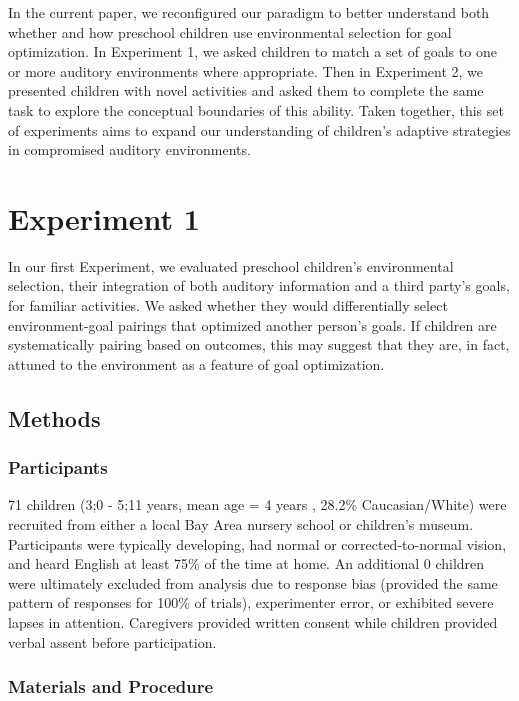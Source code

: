 \documentclass[10pt, letterpaper]{article}
\begin{document}
In the current paper, we reconfigured our paradigm to better understand
both whether and how preschool children use environmental selection for
goal optimization. In Experiment 1, we asked children to match a set of
goals to one or more auditory environments where appropriate. Then in
Experiment 2, we presented children with novel activities and asked them
to complete the same task to explore the conceptual boundaries of this
ability. Taken together, this set of experiments aims to expand our
understanding of children's adaptive strategies in compromised auditory
environments.

\hypertarget{experiment-1}{%
\section{Experiment 1}\label{experiment-1}}

In our first Experiment, we evaluated preschool children's environmental
selection, their integration of both auditory information and a third
party's goals, for familiar activities. We asked whether they would
differentially select environment-goal pairings that optimized another
person's goals. If children are systematically pairing based on
outcomes, this may suggest that they are, in fact, attuned to the
environment as a feature of goal optimization.

\hypertarget{methods}{%
\subsection{Methods}\label{methods}}

\hypertarget{participants}{%
\subsubsection{Participants}\label{participants}}

71 children (3;0 - 5;11 years, mean age = 4 years , 28.2\%
Caucasian/White) were recruited from either a local Bay Area nursery
school or children's museum. Participants were typically developing, had
normal or corrected-to-normal vision, and heard English at least 75\% of
the time at home. An additional 0 children were ultimately excluded from
analysis due to response bias (provided the same pattern of responses
for 100\% of trials), experimenter error, or exhibited severe lapses in
attention. Caregivers provided written consent while children provided
verbal assent before participation.

\hypertarget{materials-and-procedure}{%
\subsubsection{Materials and Procedure}\label{materials-and-procedure}}
\end{document}
